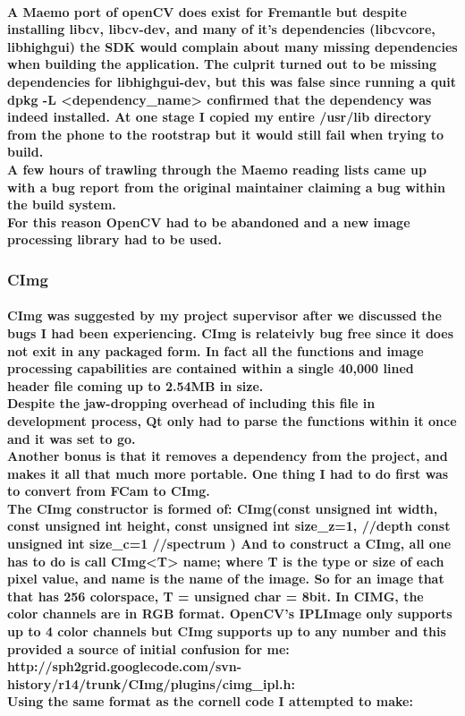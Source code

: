 \documentclass[11pt]{article} %
\begin{document}
\paragraph{
A Maemo port of openCV does exist for Fremantle \cite{libcv} but despite installing libcv, libcv-dev, and many of it's dependencies (libcvcore, libhighgui) the SDK would complain about many missing dependencies when building the application. The culprit turned out to be missing dependencies for libhighgui-dev, but this was false since running a quit dpkg -L <dependency\_name> confirmed that the dependency was indeed installed. At one stage I copied my entire /usr/lib directory from the phone to the rootstrap but it would still fail when trying to build.\\
A few hours of trawling through the Maemo reading lists came up with a bug report \cite{highgui-dev} from the original maintainer claiming a bug within the build system.\\
For this reason OpenCV had to be abandoned and a new image processing library had to be used.
}
\subsubsection{CImg}
\paragraph{CImg was suggested by my project supervisor after we discussed the bugs I had been experiencing. CImg is relateivly bug free since it does not exit in any packaged form. In fact all the functions and image processing capabilities are contained within a single 40,000 lined header file coming up to 2.54MB in size. \\Despite the jaw-dropping overhead of including this file in development process, Qt only had to parse the functions within it once and it was set to go.\\
Another bonus is that it removes a dependency from the project, and makes it all that much more portable. One thing I had to do first was to convert from FCam to CImg.
\\The CImg constructor is formed of: 
CImg(const unsigned int width,
     const unsigned int height,
     const unsigned int size\_z=1, //depth
     const unsigned int size\_c=1 //spectrum
)
And to construct a CImg, all one has to do is call CImg<T> name; where T is the type or size of each pixel value, and name is the name of the image. So for an image that that has 256 colorspace, T = unsigned char = 8bit.
In CIMG, the color channels are in RGB format. OpenCV's IPLImage only supports up to 4 color channels but CImg supports up to any number and this provided a source of initial confusion for me:
http://sph2grid.googlecode.com/svn-history/r14/trunk/CImg/plugins/cimg\_ipl.h:\\
Using the same format as the cornell code I attempted to make:}
\begin{frame}[fragile]

\end{frame}
\end{document}
